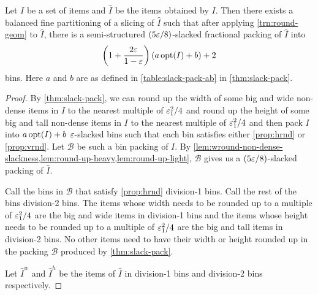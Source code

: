\begin{lemma}
\label{lem:rnd2.5}
Let $I$ be a set of items and $\widehat{I}$ be the items obtained by
\weightRoundingHyp{} $I$.
Then there exists a balanced fine partitioning of a slicing of $\widehat{I}$
such that after applying \cref{trn:round-geom} to $\widehat{I}$,
there is a semi-structured $(5\varepsilon/8)$-slacked fractional packing of $\widehat{I}$ into
\[ \left(1 + \frac{2\varepsilon}{1-\varepsilon}\right)(a \operatorname{opt}(I) + b) + 2 \] bins.
Here $a$ and $b$ are as defined in \cref{table:slack-pack-ab} in \cref{thm:slack-pack}.
\end{lemma}
\begin{proof}
By \cref{thm:slack-pack}, we can round up the width of some big and wide
non-dense items in $I$ to the nearest multiple of $\varepsilon_1^2/4$ and round up the height
of some big and tall non-dense items in $I$ to the nearest multiple of $\varepsilon_1^2/4$
and then pack $I$ into $a\operatorname{opt}(I) + b$ $\varepsilon$-slacked bins
such that each bin satisfies either \cref{prop:hrnd} or \cref{prop:vrnd}.
Let $\mathcal{B}$ be such a bin packing of $I$.
By \cref{lem:wround-non-dense-slackness,lem:round-up-heavy,lem:round-up-light},
$\mathcal{B}$ gives us a $(5\varepsilon/8)$-slacked packing of $\widehat{I}$.

Call the bins in $\mathcal{B}$ that satisfy \cref{prop:hrnd} division-1 bins.
Call the rest of the bins division-2 bins. The items whose width needs to be rounded up
to a multiple of $\varepsilon_1^2/4$ are the big and wide items in division-1 bins
and the items whose height needs to be rounded up to a multiple of $\varepsilon_1^2/4$
are the big and tall items in division-2 bins. No other items need to have their width or height
rounded up in the packing $\mathcal{B}$ produced by \cref{thm:slack-pack}.

Let $\widehat{I}^w$ and $\widehat{I}^h$ be the items of $\widehat{I}$
in division-1 bins and division-2 bins respectively.


\end{proof}
